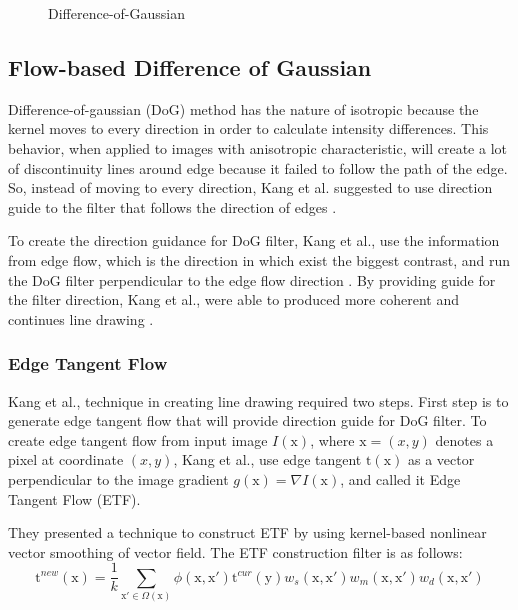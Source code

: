\begin{figure}[H]
	\centering
	\caption{Difference-of-Gaussian}\label{fig:DoG}
\end{figure}

\subsection{Flow-based Difference of Gaussian} 
Difference-of-gaussian (DoG) method has the nature of isotropic because the kernel moves to every direction in order to calculate intensity differences. This behavior, when applied to images with anisotropic characteristic, will create a lot of discontinuity lines around edge because it failed to follow the path of the edge. So, instead of moving to every direction, Kang et al. suggested to use direction guide to the filter that follows the direction of edges \cite{kang07}.

To create the direction guidance for DoG filter, Kang et al., use the information from edge flow, which is the direction in which exist the biggest contrast, and run the DoG filter perpendicular to the edge flow direction \cite{kang07}. By providing guide for the filter direction, Kang et al., were able to produced more coherent and continues line drawing .

\subsubsection{Edge Tangent Flow}
Kang et al., technique in creating line drawing required two steps. First step is to generate edge tangent flow that will provide direction guide for DoG filter. To create edge tangent flow from input image $ I(\mbox{x}) $, where $ \mbox{x} = (x,y)$ denotes a pixel at coordinate $(x,y)$, Kang et al., use edge tangent $\mbox{t}(\mbox{x}) $ as a vector perpendicular to the image gradient $ g(\mbox{x}) = \nabla I(\mbox{x})$, and called it Edge Tangent Flow (ETF). 

They presented a technique to construct ETF by using kernel-based nonlinear vector smoothing of vector field. The ETF construction filter is as follows:
\begin{equation}
	\mbox{t} ^{new}(\mbox{x} ) = \frac{1}{k} \sum_{\mathrm{x}' \in \Omega (\mathrm{x})} \phi (\mbox{x},\mbox{x}') \mbox{t} ^{cur} (\mbox{y}) w_s(\mbox{x},\mbox{x}') w_m(\mbox{x},\mbox{x}') w_d(\mbox{x},\mbox{x}')
\end{equation}

